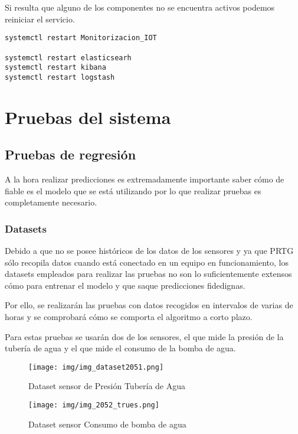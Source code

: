 Si resulta que alguno de los componentes no se encuentra activos podemos reiniciar el servicio.

\begin{lstlisting}[frame=single]  
systemctl restart Monitorizacion_IOT

systemctl restart elasticsearh
systemctl restart kibana
systemctl restart logstash
\end{lstlisting}

\section{Pruebas del sistema}

\subsection{Pruebas de regresión}

A la hora realizar predicciones es extremadamente importante saber cómo de fiable es el modelo que se está utilizando por lo que realizar pruebas es completamente necesario.


\subsubsection{Datasets}
Debido a que no se posee históricos de los datos de los sensores y ya que PRTG sólo recopila datos cuando está conectado en un equipo en funcionamiento, los datasets empleados para realizar las pruebas no son lo suficientemente extensos cómo para entrenar el modelo y que saque predicciones fidedignas. 

Por ello, se realizarán las pruebas con datos recogidos en intervalos de varias de horas y se comprobará cómo se comporta el algoritmo a corto plazo.

Para estas pruebas se usarán dos de los sensores, el que mide la presión de la tubería de agua y el que mide el consumo de la bomba de agua.

\begin{figure}[h]
	\centering
	\texttt{[image: img/img\_dataset2051.png]}
	\caption{Dataset sensor de Presión Tubería de Agua}
	\label{img_prediccion_sensor2051}
\end{figure}

\begin{figure}[h]
	\centering
	\texttt{[image: img/img\_2052\_trues.png]}
	\caption{Dataset sensor Consumo de bomba de agua}
	\label{img_prediccion_sensor2051}
\end{figure}

